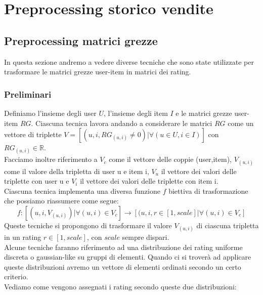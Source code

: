 
\hypertarget{(chap:capitolo4)}{}
\chapter{Preprocessing storico vendite}

\section{Preprocessing matrici grezze}
In questa sezione andremo a vedere diverse tecniche che sono state utilizzate per trasformare le matrici grezze user-item in matrici dei rating.\\

\subsection{Preliminari}
Definiamo l'insieme degli user $U$, l'insieme degli item $I$ e le matrici grezze user-item $RG$.
Ciascuna tecnica lavora andando a considerare le matrici $RG$ come un vettore di triplette $V = [(u, i, RG_{(u,i)} \neq 0) |  \forall (u \in U,i \in I)]$ con $RG_{(u,i)} \in \mathbb{R}$.\\
Facciamo inoltre riferimento a $V_c$ come il vettore delle coppie (user,item), $V_{(u,i)}$ come il valore della tripletta di user u e item i, $V_u$ il vettore dei valori delle triplette con user u e $V_i$ il vettore dei valori delle triplette con item i.\\
Ciascuna tecnica implementa una diversa funzione $f$ biettiva di trasformazione che possiamo riassumere come segue:
$$f: [(u, i, V_{(u,i)}) |  \forall (u,i) \in V_c] \rightarrow [(u, i, r \in [1,scale] | \forall (u,i) \in V_c]$$
Queste tecniche si propongono di trasformare il valore $V_{(u,i)}$ di ciascuna tripletta in un rating $r \in [1,scale]$, con $scale$ sempre dispari.\\ 
Alcune tecniche faranno riferimento ad una distribuzione dei rating uniforme discreta o gaussian-like su gruppi di elementi. Quando ci si troverà ad applicare queste distribuzioni avremo un vettore di elementi ordinati secondo un certo criterio.\\
Vediamo come vengono assegnati i rating secondo queste due distribuzioni:
